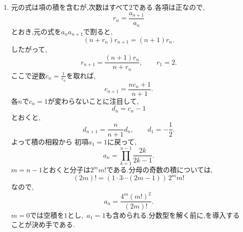 \begin{enumerate}[label=\textbf{問\arabic*.},leftmargin=3.8em,format=\bookitemlink{practice-advanced}{solution}{problem}]
                指数は$0,1,3,8,21,\ldots$となる.巨大な積を計算する難しさは,重み付き総和の差を2回取ることで消えている.
          \item 元の式は項の積を含むが,次数はすべて$2$である.各項は正なので,
                \[
                  r_n=\frac{a_{n+1}}{a_n}
                \]
                とおき,元の式を$a_na_{n+1}$で割ると,
                \[
                  (n+r_n)r_{n+1}=(n+1)r_n.
                \]
                したがって,
                \[
                  r_{n+1}=\frac{(n+1)r_n}{n+r_n},
                  \qquad r_1=2.
                \]
                ここで逆数$\displaystyle c_n=\frac{1}{r_n}$を取れば,
                \[
                  c_{n+1}=\frac{nc_n+1}{n+1}.
                \]
                各$n$で$c_n=1$が変わらないことに注目して,
                \[
                  d_n=c_n-1
                \]
                とおくと,
                \[
                  d_{n+1}=\frac{n}{n+1}d_n,\qquad d_1=-\frac12.
                \]
                よって積の相殺から
\BookMathLayout{\[
                  d_n=-\frac1{2n},\qquad
                  c_n=\frac{2n-1}{2n},\qquad
                  r_n=\frac{2n}{2n-1}.
                \]}{
\[
\begin{aligned}
d_n&=-\frac1{2n},\\c_n&=\frac{2n-1}{2n},\\r_n&=\frac{2n}{2n-1}.
\end{aligned}
\]
}
                初項$a_1=1$に戻って,
                \[
                  a_n=\prod_{k=1}^{n-1}\frac{2k}{2k-1}.
                \]
                $m=n-1$とおくと分子は$2^m m!$である.分母の奇数の積については,
                \[
                  (2m)!
                   =(1\cdot3\cdots(2m-1))\,2^m m!
                \]
                なので,
                \[
                  a_n=\frac{4^m(m!)^2}{(2m)!}.
                \]
                $m=0$では空積を$1$とし,\, $a_1=1$も含められる.分数型を解く前に,を導入することが決め手である.


\end{enumerate}
